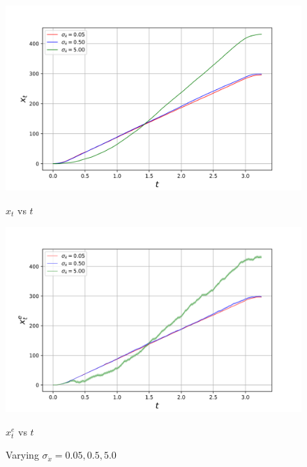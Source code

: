 \begin{figure}[H]
    \centering
    \begin{minipage}{0.491\linewidth}
        \centering
        \includegraphics[width=\linewidth]{plots/part1-d.1-xt.png}
        \caption*{$x_t$ vs $t$}

    \end{minipage}
    \hfill
    \begin{minipage}{0.49\linewidth}
        \centering
        \includegraphics[width=\linewidth]{plots/part1-d.1-xe.png}
         \caption*{$x_t^e$ vs $t$}
    \end{minipage}
    \caption{Varying $\sigma_{\dot{x}} = 0.05, 0.5, 5.0$}
    \label{fig:part1-vary-sigma_x_dot}
    
\end{figure}

